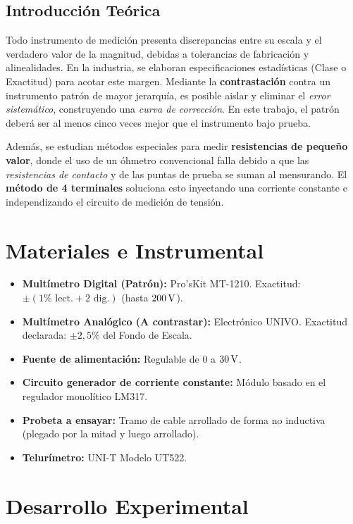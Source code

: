 \documentclass{informeutn}
\begin{document}
\section{Introducción Teórica}
Todo instrumento de medición presenta discrepancias entre su escala y el verdadero valor de la magnitud, debidas a tolerancias de fabricación y alinealidades. En la industria, se elaboran especificaciones estadísticas (Clase o Exactitud) para acotar este margen. Mediante la \textbf{contrastación} contra un instrumento patrón de mayor jerarquía, es posible aislar y eliminar el \textit{error sistemático}, construyendo una \textit{curva de corrección}. En este trabajo, el patrón deberá ser al menos cinco veces mejor que el instrumento bajo prueba.

Además, se estudian métodos especiales para medir \textbf{resistencias de pequeño valor}, donde el uso de un óhmetro convencional falla debido a que las \textit{resistencias de contacto} y de las puntas de prueba se suman al mensurando. El \textbf{método de 4 terminales} soluciona esto inyectando una corriente constante e independizando el circuito de medición de tensión. 

\chapter{Materiales e Instrumental}
\begin{itemize}
    \item \textbf{Multímetro Digital (Patrón):} Pro'sKit MT-1210. Exactitud: $\pm (1\% \text{ lect.} + 2 \text{ dig.})$ (hasta $200 \,\mathrm{V}$).
    \item \textbf{Multímetro Analógico (A contrastar):} Electrónico UNIVO. Exactitud declarada: $\pm 2,5 \percent$ del Fondo de Escala.
    \item \textbf{Fuente de alimentación:} Regulable de $0$ a $30 \,\mathrm{V}$.
    \item \textbf{Circuito generador de corriente constante:} Módulo basado en el regulador monolítico LM317.
    \item \textbf{Probeta a ensayar:} Tramo de cable arrollado de forma no inductiva (plegado por la mitad y luego arrollado).
    \item \textbf{Telurímetro:} UNI-T Modelo UT522.
\end{itemize}

\chapter{Desarrollo Experimental}
\end{document}
